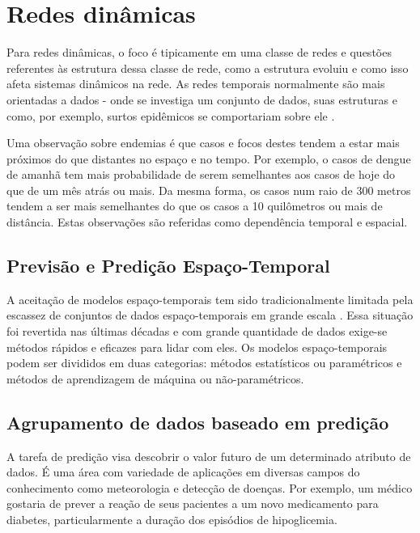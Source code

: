 \chapter{Redes dinâmicas}
 \label{chap:redes-dinamicas}
 
Para redes dinâmicas, o foco é tipicamente em uma classe de redes e questões referentes às estrutura dessa classe de rede, como a estrutura evoluiu e como isso afeta sistemas dinâmicos na rede. As redes temporais normalmente são mais orientadas a dados - onde se investiga um conjunto de dados, suas estruturas e como, por exemplo, surtos epidêmicos se comportariam sobre ele \cite{holme:colloquium}.

Uma observação sobre endemias é que casos e focos destes tendem a estar mais próximos do que distantes no espaço e no tempo. Por exemplo, o casos de dengue de amanhã tem mais probabilidade de serem semelhantes aos casos de hoje do que de um mês atrás ou mais. Da mesma forma, os casos num raio de 300 metros tendem a ser mais semelhantes do que os casos a 10 quilômetros ou mais de distância. Estas observações são referidas como dependência temporal e espacial.

\section{Previsão e Predição Espaço-Temporal}

A aceitação de modelos espaço-temporais tem sido tradicionalmente limitada pela escassez de conjuntos de dados espaço-temporais em grande escala \cite{Griffith2010}. Essa situação foi revertida nas últimas décadas e com grande quantidade de dados exige-se métodos rápidos e eficazes para lidar com eles. Os modelos espaço-temporais podem ser divididos em duas categorias: métodos estatísticos ou paramétricos e métodos de aprendizagem de máquina ou não-paramétricos.


\section{Agrupamento de dados baseado em predição}

A tarefa de predição visa descobrir o valor futuro de um determinado atributo de dados. É uma área com variedade de aplicações em diversas campos do conhecimento como meteorologia e detecção de doenças. Por exemplo, um médico gostaria de prever a reação de seus pacientes a um novo medicamento para diabetes, particularmente a duração dos episódios de hipoglicemia.

